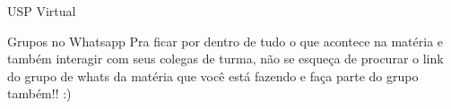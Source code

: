 \begin{secao}{USP Virtual}
\begin{subsecao}{Grupos no Whatsapp}
Pra ficar por dentro de tudo o que acontece na matéria e também interagir com seus colegas
de turma, não se esqueça de procurar o link do grupo de whats da matéria que você está fazendo
e faça parte do grupo também!! :)

\end{subsecao}

%
%
%
%
%
\end{secao}
